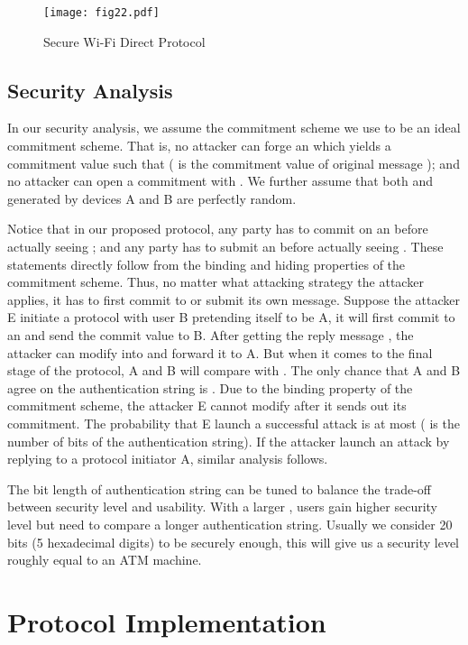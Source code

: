 \documentclass[conference]{IEEEtran}
\begin{document}
\begin{figure*}[htbp]
  \centering
  \scalebox{0.571}
  {\texttt{[image: fig22.pdf]}}
  \caption{Secure Wi-Fi Direct Protocol}
  \label{fig:fig3}
  \vspace{-3mm}
\end{figure*}

\subsection{Security Analysis}
In our security analysis, we assume the commitment scheme we use to be an ideal commitment scheme. That is, no attacker can forge an  which yields a commitment value  such that  ( is the commitment value of original message ); and no attacker can open a commitment with . We further assume that both  and  generated by devices A and B are perfectly random. 

Notice that in our proposed protocol, any party has to commit on an  before actually seeing ; and any party has to submit an  before actually seeing . These statements directly follow from the binding and hiding properties of the commitment scheme. Thus, no matter what attacking strategy the attacker applies, it has to first commit to or submit its own  message. Suppose the attacker E initiate a protocol with user B pretending itself to be A, it will first commit to an  and send the commit value  to B. After getting the reply message , the attacker can modify  into  and forward it to A. But when it comes to the final stage of the protocol, A and B will compare  with . The only chance that A and B agree on the authentication string is . Due to the binding property of the commitment scheme, the attacker E cannot modify  after it sends out its commitment. The probability that E launch a successful attack is at most  ( is the number of bits of the authentication string). If the attacker launch an attack by replying  to a protocol initiator A, similar analysis follows. 

The bit length  of authentication string can be tuned to balance the trade-off between security level and usability. With a larger , users gain higher security level but need to compare a longer authentication string. Usually we consider 20 bits (5 hexadecimal digits) to be securely enough, this will give us a security level roughly equal to an ATM machine.


\section{Protocol Implementation \label{sec4}}
\end{document}
